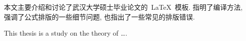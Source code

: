 

\begin{cnabstract}
本文主要介绍和讨论了武汉大学硕士毕业论文的~\LaTeX~模板.
指明了编译方法, 强调了公式排版的一些细节问题, 也指出了一些常见的排版错误.



\end{cnabstract}
\vspace{1em}\par\vfill





\begin{enabstract}
This thesis is a study on the theory of \dots.




\end{enabstract}
\vspace{1em}\par\vfill

\enkeywords{\LaTeX{}, \dots}


